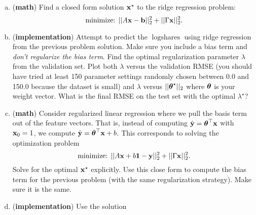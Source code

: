 \documentclass[12pt,letterpaper,fleqn]{hmcpset}
\begin{document}
\begin{enumerate}[(a)]
    \item (\textbf{math}) Find a closed form solution ${\bf x}^\star$ to the ridge regression
        problem:
        \[
            \text{minimize: } ||A{\bf x} - {\bf b}||_2^2 + ||\Gamma{\bf x}||_2^2.
        \]
    \item (\textbf{implementation}) Attempt to predict the $\log\text{shares}$ using ridge
        regression from the previous problem solution. Make sure you include a bias
        term and \textit{don't regularize the bias term}.
        Find the optimal regularization parameter $\lambda$
        from the validation set. Plot both $\lambda$ versus the validation RMSE (you should have
        tried at least 150 parameter settings randomly chosen between 0.0 and 150.0 because
        the dataset is small)
        and $\lambda$ versus $||\hbox{\boldmath$\theta$}^\star||_2$ where $\hbox{\boldmath$\theta$}$ is your weight vector.
        What is the final RMSE on the test set with the optimal $\lambda^\star$?
    \item (\textbf{math}) Consider regularized linear regression where we pull the
        basis term out of the feature vectors. That is, instead of computing $\hat{{\bf y}}
        = \hbox{\boldmath$\theta$}^\top{\bf x}$ with ${\bf x}_0 = 1$, we compute $\hat{{\bf y}} = \hbox{\boldmath$\theta$}^\top{\bf x} + b$.
        This corresponds to solving the optimization problem
        \[
            \text{minimize: } ||A{\bf x} + b{\bf 1} - {\bf y}||_2^2 + ||\Gamma{\bf x}||_2^2.
        \]
        Solve for the optimal ${\bf x}^\star$ explicitly. Use this close form to compute the
        bias term for the previous problem (with the same regularization strategy). Make
        sure it is the same.
    \item (\textbf{implementation}) Use the solution
\end{enumerate}
\clearpage
\end{document}
